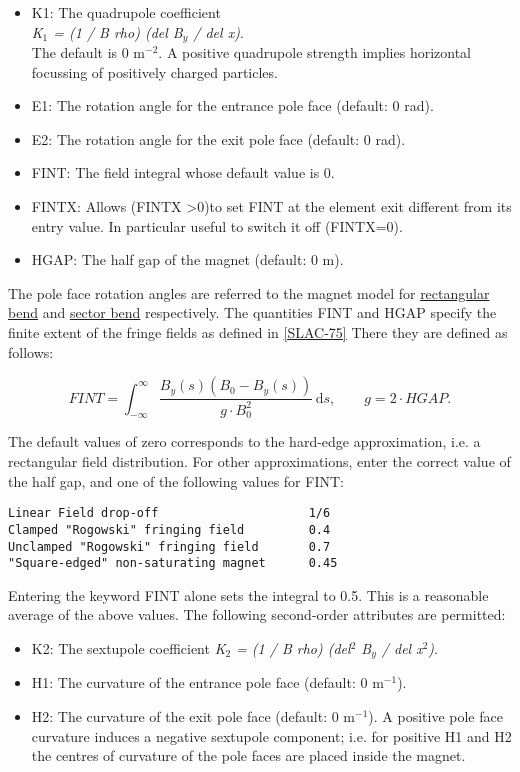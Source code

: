 \begin{itemize}
   \item K1: The quadrupole coefficient \\
     \textit{K$_1$ = (1 / B rho) (del B$_y$ / del x)}. \\
     The default is 0 m$^{-2}$. A positive quadrupole strength implies
     horizontal focussing of positively charged particles. 

   \item E1: The rotation angle for the entrance pole face (default: 0 rad). 
   \item E2: The rotation angle for the exit pole face (default: 0 rad). 
   \item FINT: The field integral whose default value is 0. 
   \item FINTX: Allows (FINTX \textgreater 0)to set FINT at the element
     exit different from its entry value. In particular useful to switch
     it off (FINTX=0). 

   \item HGAP: The half gap of the magnet (default: 0 m). 
\end{itemize} 

The pole face rotation angles are referred to the magnet model for
\href{local_system.html#rbend}{rectangular bend} and
\href{local_system.html#sbend}{sector bend} respectively. The quantities
FINT and HGAP specify the finite extent of the fringe fields as defined
in \href{bibliography.html#slac75}{[SLAC-75]} There they are defined as
follows:  


\[
FINT=\int_{-\infty}^\infty \frac{B_y(s)(B_0-B_y(s))}{g \cdot B_0^2}\,\mathrm{d}s ,\quad\quad g=2\cdot HGAP.
\]

The default values of zero corresponds to the hard-edge approximation,
i.e. a rectangular field distribution. For other approximations, enter
the correct value of the half gap, and one of the following values for
FINT:  
\begin{verbatim}
Linear Field drop-off                     1/6
Clamped "Rogowski" fringing field         0.4
Unclamped "Rogowski" fringing field       0.7
"Square-edged" non-saturating magnet      0.45
\end{verbatim} 

Entering the keyword FINT alone sets the integral to 0.5. This is a
reasonable average of the above values.  The following second-order
attributes are permitted:  
\begin{itemize}
    \item K2: The sextupole coefficient \textit{K$_2$ = (1 / B rho)
      (del$^2$ B$_y$ / del x$^2$)}.  
    \item H1: The curvature of the entrance pole face (default: 0
      m$^{-1}$).  
    \item H2: The curvature of the exit pole face (default: 0
      m$^{-1}$). A positive pole face curvature induces a negative
      sextupole component; i.e. for positive H1 and H2 the centres of
      curvature of the pole faces are placed inside the magnet.  
\end{itemize} 

